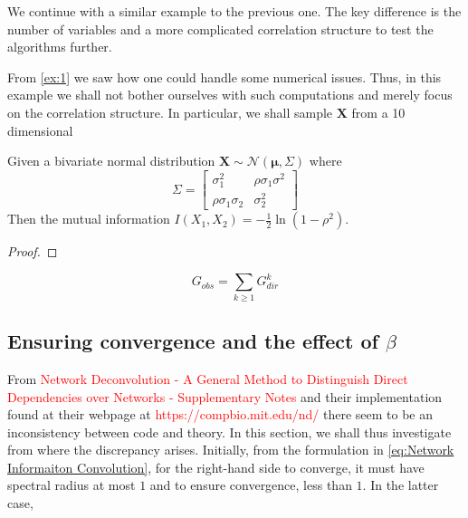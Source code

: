 \documentclass[../Thesis.tex]{subfiles}
\begin{document}
We continue with a similar example to the previous one. The key difference is the number of variables and a more complicated correlation structure to test the algorithms further.
\begin{example}
    From \autoref{ex:1} we saw how one could handle some numerical issues. Thus, in this example we shall not bother ourselves with such computations and merely focus on the correlation structure. In particular, we shall sample $\boldsymbol X$ from a 10 dimensional
\end{example}


\newpage
\begin{proposition} \label{prop:MI bivariate gaussian}
    Given a bivariate normal distribution $\boldsymbol X \sim \mathcal{N}\left(\boldsymbol \mu,  \Sigma\right)$ where
    $$\Sigma =
        \begin{bmatrix}
            \sigma_1^2             & \rho \sigma_1 \sigma^2 \\
            \rho \sigma_1 \sigma_2 & \sigma_2^2
        \end{bmatrix}
    $$
    Then the mutual information $I\left(X_1, X_2\right) = -\frac{1}{2}\ln \left(1 - \rho^2\right)$.
\end{proposition}
\begin{proof}

\end{proof}

\begin{equation}\label{eq:Network Informaiton Convolution}
    G_{obs} = \sum_{k \geq 1} G_{dir}^k
\end{equation}


\subsection{Ensuring convergence and the effect of $\beta$}
From \textcolor{red}{Network Deconvolution - A General Method to Distinguish
    Direct Dependencies over Networks - Supplementary Notes} and their implementation found at their webpage at \textcolor{red}{https://compbio.mit.edu/nd/} there seem to be an inconsistency between code and theory. In this section, we shall thus investigate from where the discrepancy arises. Initially, from the formulation in \autoref{eq:Network Informaiton Convolution}, for the right-hand side to converge, it must have spectral radius at most $1$ and to ensure convergence, less than $1$. In the latter case,
\end{document}
